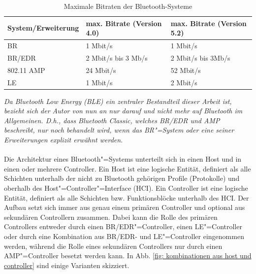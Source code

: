 \begin{table}
    \begin{tabular}[h]{|l|l|l|}
    \hline
    \textbf{System/Erweiterung} & \textbf{max. Bitrate (Version 4.0)} & \textbf{max. Bitrate (Version 5.2)} \\
    \hline
    BR          & 1 Mbit/s \cite{BtSpec4.0_124}               & 1 Mbit/s \cite{BtSpec5.2_188}           \\
    \hline
    BR/EDR      & 2 Mbit/s bis 3 Mb/s \cite{BtSpec4.0_124}    & 2 Mbit/s bis 3Mb/s \cite{BtSpec5.2_188} \\
    \hline
    802.11 AMP  & 24 Mbit/s \cite{BtSpec4.0_123}              & 52 Mbit/s \cite{BtSpec5.2_187}          \\
    \hline
    LE          & 1 Mbit/s \cite{BtSpec4.0_126}               & 2 Mbit/s \cite{BtSpec5.2_190}           \\
    \hline
    \end{tabular}
    \caption[Maximale Bitraten der Bluetooth-Systeme]{Maximale Bitraten der Bluetooth-Systeme}
    \label{tab: maximale Bitraten BT}
\end{table}

\textit{Da Bluetooth Low Energy (BLE) ein zentraler Bestandteil dieser Arbeit ist, bezieht sich der Autor von nun an nur darauf und nicht mehr auf Bluetooth im Allgemeinen. D.h., dass Bluetooth Classic, welches BR/EDR und AMP beschreibt, nur noch behandelt wird, wenn das BR"=System oder eine seiner Erweiterungen explizit erwähnt werden.}
\\\\
Die Architektur eines Bluetooth"=Systems unterteilt sich in einen Host und in einen oder mehrere Controller. Ein Host ist eine logische Entität, definiert als alle Schichten unterhalb der nicht zu Bluetooth gehörigen Profile (Protokolle) und oberhalb des Host"=Controller"=Interface (HCI). Ein Controller ist eine logische Entität, definiert als alle Schichten bzw. Funktionsblöcke unterhalb des HCI. Der Aufbau setzt sich immer aus genau einem primären Controller und optional aus sekundären Controllern zusammen. Dabei kann die Rolle des primären Controllers entweder durch einen BR/EDR"=Controller, einen LE"=Controller oder durch eine Kombination aus BR/EDR- und LE"=Controller eingenommen werden, während die Rolle eines sekundären Controllers nur durch einen AMP"=Controller besetzt werden kann. In Abb. \ref{fig: kombinationen aus host und controller} sind einige Varianten skizziert. 


